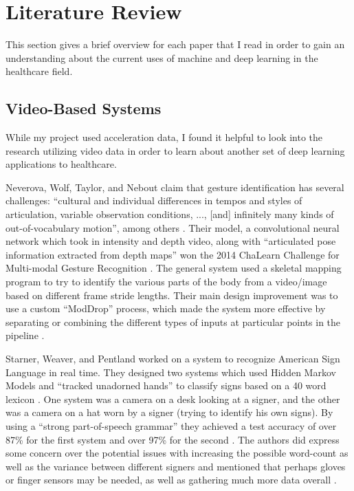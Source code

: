 \documentclass[]{report}
\begin{document}
\section{Literature Review}

This section gives a brief overview for each paper that I read in order to gain an understanding about the current uses of machine and deep learning in the healthcare field.

\subsection{Video-Based Systems}

While my project used acceleration data, I found it helpful to look into the research utilizing video data in order to learn about another set of deep learning applications to healthcare.

Neverova, Wolf, Taylor, and Nebout claim that gesture identification has several challenges: “cultural and individual differences in tempos and styles of articulation, variable observation conditions, ..., [and] infinitely many kinds of out-of-vocabulary motion”, among others \cite{Neverova}. Their model, a convolutional neural network which took in intensity and depth video, along with “articulated pose information extracted from depth maps” won the 2014 ChaLearn Challenge for Multi-modal Gesture Recognition \cite{Neverova}. The general system used a skeletal mapping program to try to identify the various parts of the body from a video/image based on different frame stride lengths. Their main design improvement was to use a custom “ModDrop” process, which made the system more effective by separating or combining the different types of inputs at particular points in the pipeline \cite{Neverova}. 

Starner, Weaver, and Pentland worked on a system to recognize American Sign Language in real time. They designed two systems which used Hidden Markov Models and “tracked unadorned hands” to classify signs based on a 40 word lexicon \cite{Starner98}. One system was a camera on a desk looking at a signer, and the other was a camera on a hat worn by a signer (trying to identify his own signs). By using a “strong part-of-speech grammar” they achieved a test accuracy of over 87\% for the first system and over 97\% for the second \cite{Starner98}. The authors did express some concern over the potential issues with increasing the possible word-count as well as the variance between different signers and mentioned that perhaps gloves or finger sensors may be needed, as well as gathering much more data overall \cite{Starner98}.
\end{document}
